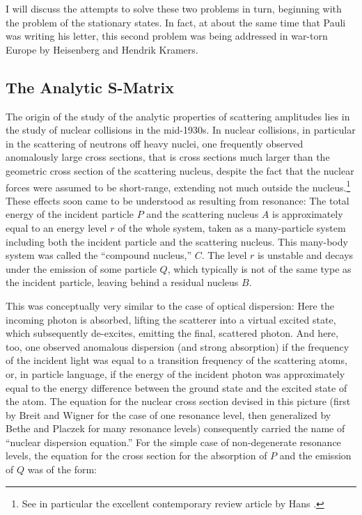 \documentclass[12pt]{article}
\begin{document}
I will discuss the attempts to solve these two problems in turn, beginning with the problem of the stationary states. In fact, at about the same time that Pauli was writing his letter, this second problem was being addressed in war-torn Europe by Heisenberg and Hendrik Kramers.

\subsection{The Analytic S-Matrix}

The origin of the study of the analytic properties of scattering amplitudes lies in the study of nuclear collisions in the mid-1930s. In nuclear collisions, in particular in the scattering of neutrons off heavy nuclei, one frequently observed anomalously large cross sections, that is cross sections much larger than the geometric cross section of the scattering nucleus, despite the fact that the nuclear forces were assumed to be short-range, extending not much outside the  nucleus.\footnote{See in particular the excellent contemporary review article by Hans \citet{bethe_1937_nuclear}.} These effects soon came to be understood as resulting from resonance: The total energy of the incident particle $P$ and the scattering nucleus $A$ is approximately equal to an energy level $r$ of the whole system, taken as a many-particle system including both the incident particle and the scattering nucleus. This many-body system was called the ``compound nucleus,'' $C$. The level $r$ is unstable and decays under the emission of some particle $Q$, which typically is not of the same type as the incident particle, leaving behind a residual nucleus $B$. 

This was conceptually very similar to the case of optical dispersion: Here the incoming photon is absorbed, lifting the scatterer into a virtual excited state, which subsequently de-excites, emitting the final, scattered photon. And here, too, one observed anomalous dispersion (and strong absorption) if the frequency of the incident light was equal to a transition frequency of the scattering atoms, or, in particle language, if the energy of the incident photon was approximately equal to the energy difference between the ground state and the excited state of the atom. The equation for the nuclear cross section devised in this picture (first by Breit and Wigner for the case of one resonance level, then generalized by Bethe and Placzek for many resonance levels) consequently carried the name of ``nuclear dispersion equation.'' For the simple case of non-degenerate resonance levels, the equation for the cross section for the absorption of $P$ and the emission of $Q$ was of the form:
\end{document}
